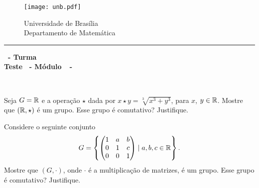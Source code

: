 \documentclass[12pt]{exam}
\begin{document}
    \begin{figure}[h]
        \begin{minipage}[c]{1.7cm}
            \texttt{[image: unb.pdf]}
        \end{minipage}
        \hspace{0pt}
        \begin{minipage}[c]{4in}
            {Universidade de Brasília} \\
            {Departamento de Matemática}
        \end{minipage}
    \end{figure}
    \hrule
    \begin{center}
        {\Large\bf \disciplina\ - Turma \turma}  \\
         {\large\bf Teste \numeroteste\ - Módulo\ \modulo\ -\ \dataavaliacao}
    \end{center}

    \\
    \vspace*{.01cm}


    \vspace{.6cm}


    \questao Seja $G = \mathbb{R}$ e a operação $\star$ dada por $x \star y = \sqrt[3]{x^3 + y^3}$, para $x$, $y \in \mathbb{R}$. Mostre que $(\mathbb{R}, \star)$ é um grupo. Esse grupo é comutativo? Justifique.

    \vspace{1cm}

    \questao Considere o seguinte conjunto
    \[
    G = \left\{\begin{pmatrix} 1 & a & b\\ 0 & 1 & c \\ 0 & 0 & 1\end{pmatrix} \mid a, b, c \in \mathbb{R}\right\}.
    \]
    Mostre que $(G, \cdot)$, onde $\cdot$ é a multiplicação de matrizes, é um grupo. Esse grupo é comutativo? Justifique.
\end{document}
